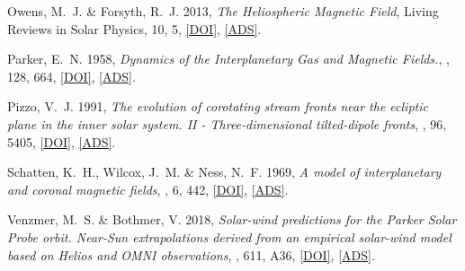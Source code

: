 	{Owens}, M.~J. \& {Forsyth}, R.~J. 2013, \emph{{The Heliospheric Magnetic
	Field}}, Living Reviews in Solar Physics, 10, 5,
	\href{http://dx.doi.org/10.12942/lrsp-2013-5}{[DOI]},
	\href{http://adsabs.harvard.edu/abs/2013LRSP...10....5O}{[ADS]}.

	{Parker}, E.~N. 1958, \emph{{Dynamics of the Interplanetary Gas and Magnetic Fields.}}, \apj, 128, 664, \href{http://dx.doi.org/10.1086/146579}{[DOI]}, \href{http://adsabs.harvard.edu/abs/1958ApJ...128..664P}{[ADS]}.

	{Pizzo}, V.~J. 1991, \emph{{The evolution of corotating stream fronts near the
	ecliptic plane in the inner solar system. II - Three-dimensional
	tilted-dipole fronts}}, \jgr, 96, 5405,
	\href{http://dx.doi.org/10.1029/91JA00155}{[DOI]},
	\href{http://adsabs.harvard.edu/abs/1991JGR....96.5405P}{[ADS]}.
	
	{Schatten}, K.~H., {Wilcox}, J.~M. \& {Ness}, N.~F. 1969, \emph{{A model of
	interplanetary and coronal magnetic fields}}, \solphys, 6, 442,
	\href{http://dx.doi.org/10.1007/BF00146478}{[DOI]},
	\href{http://adsabs.harvard.edu/abs/1969SoPh....6..442S}{[ADS]}.

	{Venzmer}, M.~S. \& {Bothmer}, V. 2018, \emph{{Solar-wind predictions for the
	Parker Solar Probe orbit. Near-Sun extrapolations derived from an empirical
	solar-wind model based on Helios and OMNI observations}}, \aap, 611, A36,
	\href{http://dx.doi.org/10.1051/0004-6361/201731831}{[DOI]},
	\href{http://adsabs.harvard.edu/abs/2018A\%26A...611A..36V}{[ADS]}.

